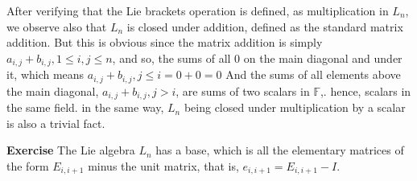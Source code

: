 \documentclass[12pt]{article}
\begin{document}
After verifying that the Lie brackets operation is defined, as multiplication in \( L_{n} \), we observe also that \( L_{n} \) \newline
is closed under addition, defined as the standard matrix addition. But this is obvious since the matrix addition is simply \( a_{i,j}+b_{i,j},1 \leq i,j \leq n \), \newline 
and so, the sums of all \( 0 \) on the main diagonal and under it, which means \( a_{i,j}+b_{i,j},j \leq i=0+0=0 \)\newline
And the sums of all elements above the main diagonal, \( a_{i,j}+b_{i,j},j > i \), are sums of two scalars in \( \mathbb{F} \),. \newline
hence, scalars in the same field. \newline
in the same way, \( L_{n} \) being closed under multiplication by a scalar is also a trivial fact. \newline

\textbf{Exercise} The Lie algebra \( L_{n} \) has a base, which is all the elementary matrices of the form \( E_{i,i+1} \) minus the unit matrix, that is, \( e_{i,i+1}=E_{i,i+1}-I \). \newline
\end{document}
